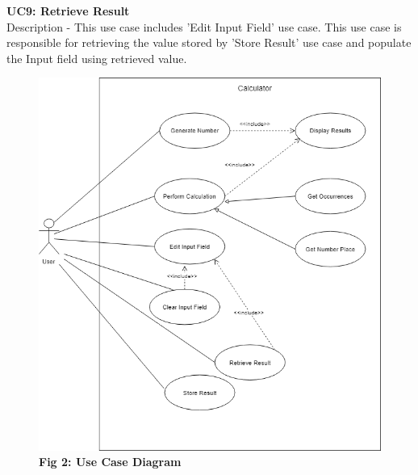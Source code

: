 \documentclass[paper=a4, fontsize=11pt]{report}
\numberwithin{equation}{section}		%
\numberwithin{figure}{section}			%
\numberwithin{table}{section}				%
\begin{document}
\begin{flushleft}
\textbf{UC9: Retrieve Result}
\\Description - This use case includes 'Edit Input Field' use case. This use case is responsible for retrieving the value stored by 'Store Result' use case and populate the Input field using retrieved value. 
\end{flushleft}

\pagebreak
\begin{figure}[htp]
    \centering
    \vspace{2cm}
    \includegraphics[width=15cm]{UseCaseDiagram.png}
    \caption*{\textbf{Fig 2: Use Case Diagram}}
\end{figure}
\end{document}

